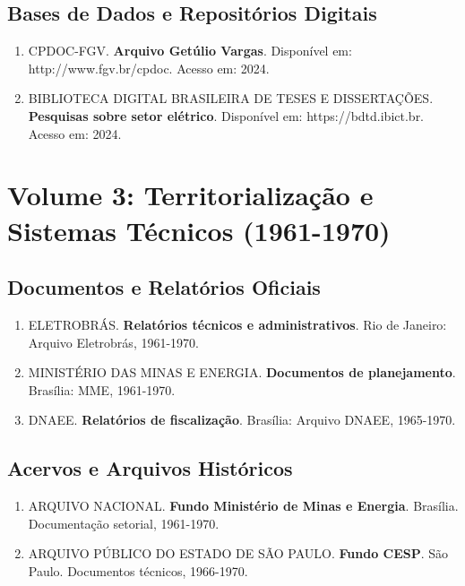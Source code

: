 \documentclass[12pt,a4paper]{report}
\begin{document}
\section*{Bases de Dados e Repositórios Digitais}
\begin{enumerate}[leftmargin=*]
    \item CPDOC-FGV. \textbf{Arquivo Getúlio Vargas}. Disponível em: http://www.fgv.br/cpdoc. Acesso em: 2024.
    
    \item BIBLIOTECA DIGITAL BRASILEIRA DE TESES E DISSERTAÇÕES. \textbf{Pesquisas sobre setor elétrico}. Disponível em: https://bdtd.ibict.br. Acesso em: 2024.
\end{enumerate}

\chapter*{Volume 3: Territorialização e Sistemas Técnicos (1961-1970)}

\section*{Documentos e Relatórios Oficiais}
\begin{enumerate}[leftmargin=*]
    \item ELETROBRÁS. \textbf{Relatórios técnicos e administrativos}. Rio de Janeiro: Arquivo Eletrobrás, 1961-1970.
    
    \item MINISTÉRIO DAS MINAS E ENERGIA. \textbf{Documentos de planejamento}. Brasília: MME, 1961-1970.
    
    \item DNAEE. \textbf{Relatórios de fiscalização}. Brasília: Arquivo DNAEE, 1965-1970.
\end{enumerate}

\section*{Acervos e Arquivos Históricos}
\begin{enumerate}[leftmargin=*]
    \item ARQUIVO NACIONAL. \textbf{Fundo Ministério de Minas e Energia}. Brasília. Documentação setorial, 1961-1970.
    
    \item ARQUIVO PÚBLICO DO ESTADO DE SÃO PAULO. \textbf{Fundo CESP}. São Paulo. Documentos técnicos, 1966-1970.
\end{enumerate}
\end{document}
